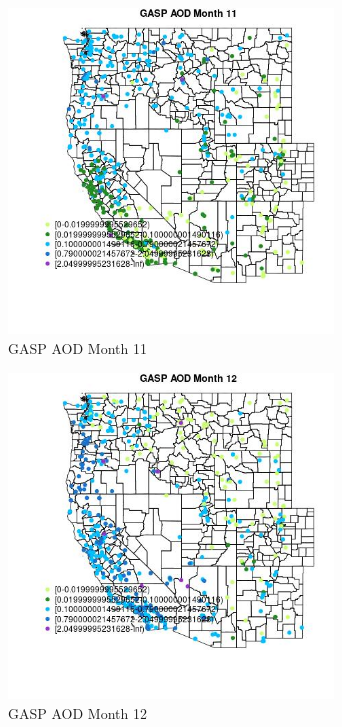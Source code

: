 \begin{figure} 
\centering  
\includegraphics[width=0.77\textwidth]{Code_Outputs/Report_ML_input_PM25_Step4_part_e_de_duplicated_aves_compiled_2019-05-14wNAs_MapObsMo11GASP_AOD.jpg} 
\caption{\label{fig:Report_ML_input_PM25_Step4_part_e_de_duplicated_aves_compiled_2019-05-14wNAsMapObsMo11GASP_AOD}GASP AOD Month 11} 
\end{figure} 
 

\clearpage 

\begin{figure} 
\centering  
\includegraphics[width=0.77\textwidth]{Code_Outputs/Report_ML_input_PM25_Step4_part_e_de_duplicated_aves_compiled_2019-05-14wNAs_MapObsMo12GASP_AOD.jpg} 
\caption{\label{fig:Report_ML_input_PM25_Step4_part_e_de_duplicated_aves_compiled_2019-05-14wNAsMapObsMo12GASP_AOD}GASP AOD Month 12} 
\end{figure} 
 

